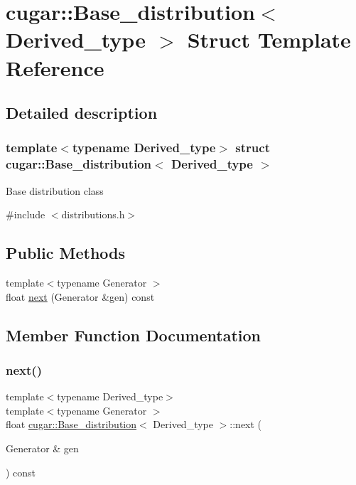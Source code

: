 \hypertarget{structcugar_1_1_base__distribution}{}\section{cugar\+:\+:Base\+\_\+distribution$<$ Derived\+\_\+type $>$ Struct Template Reference}
\label{structcugar_1_1_base__distribution}


\subsection{Detailed description}
\subsubsection*{template$<$typename Derived\+\_\+type$>$\newline
struct cugar\+::\+Base\+\_\+distribution$<$ Derived\+\_\+type $>$}

Base distribution class 

{\ttfamily \#include $<$distributions.\+h$>$}

\subsection*{Public Methods}
\begin{DoxyCompactItemize}
\item 
{\footnotesize template$<$typename Generator $>$ }\\float \hyperlink{structcugar_1_1_base__distribution_a73f57950c7cb2de2fe3f01a44e40b35c}{next} (Generator \&gen) const
\end{DoxyCompactItemize}


\subsection{Member Function Documentation}
\mbox{\label{structcugar_1_1_base__distribution_a73f57950c7cb2de2fe3f01a44e40b35c}} 
\subsubsection{\texorpdfstring{next()}{next()}}
{\footnotesize\ttfamily template$<$typename Derived\+\_\+type$>$ \\
template$<$typename Generator $>$ \\
float \hyperlink{structcugar_1_1_base__distribution}{cugar\+::\+Base\+\_\+distribution}$<$ Derived\+\_\+type $>$\+::next (\begin{DoxyParamCaption}\item[{Generator \&}]{gen }\end{DoxyParamCaption}) const\hspace{0.3cm}{\ttfamily [inline]}}


